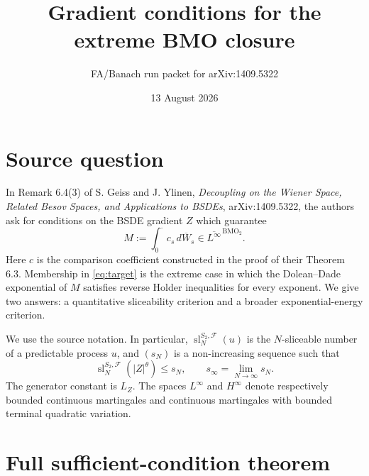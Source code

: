 \documentclass[11pt]{article}
\title{Gradient conditions for the extreme BMO closure}
\author{FA/Banach run packet for arXiv:1409.5322}
\date{13 August 2026}
\newcommand{\BMO}{\mathrm{BMO}}
\newcommand{\F}{\mathcal F}
\newcommand{\slc}{\operatorname{sl}}
\begin{document}
\setlength{\emergencystretch}{3em}
\maketitle

\section*{Source question}

In Remark 6.4(3) of S. Geiss and J. Ylinen,
\emph{Decoupling on the Wiener Space, Related Besov Spaces, and Applications
to BSDEs}, arXiv:1409.5322, the authors ask for conditions on the BSDE
gradient \(Z\) which guarantee
\begin{equation}\label{eq:target}
 M:=\int_0^\cdot c_s\,d\overline W_s
 \in \overline{L^\infty}^{\,\BMO_2}.
\end{equation}
Here \(c\) is the comparison coefficient constructed in the proof of their
Theorem 6.3. Membership in \eqref{eq:target} is the extreme case in which the
Dolean--Dade exponential of \(M\) satisfies reverse Holder inequalities for
every exponent. We give two answers: a quantitative sliceability criterion
and a broader exponential-energy criterion.

We use the source notation. In particular,
\(\slc_N^{S_2,\F}(u)\) is the \(N\)-sliceable number of a predictable process
\(u\), and \((s_N)\) is a non-increasing sequence such that
\begin{equation}\label{eq:sN}
 \slc_N^{S_2,\F}(|Z|^\theta)\leq s_N,
 \qquad s_\infty=\lim_{N\to\infty}s_N.
\end{equation}
The generator constant is \(L_Z\). The spaces \(L^\infty\) and \(H^\infty\)
denote respectively bounded continuous martingales and continuous
martingales with bounded terminal quadratic variation.

\section*{Full sufficient-condition theorem}
\end{document}
